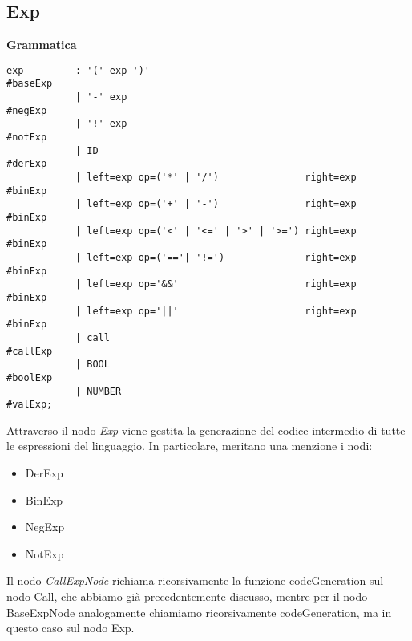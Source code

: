 \documentclass[12pt,twoside,openright,a4paper]{report}
\begin{document}
\subsection{Exp}
\textbf{Grammatica}
\begin{lstlisting}
exp	        : '(' exp ')'				                        #baseExp
            | '-' exp					                        #negExp
            | '!' exp                                           #notExp
            | ID						                        #derExp
            | left=exp op=('*' | '/')               right=exp   #binExp
            | left=exp op=('+' | '-')               right=exp   #binExp
            | left=exp op=('<' | '<=' | '>' | '>=') right=exp   #binExp
            | left=exp op=('=='| '!=')              right=exp   #binExp
            | left=exp op='&&'                      right=exp   #binExp
            | left=exp op='||'                      right=exp   #binExp
            | call                                              #callExp
            | BOOL                                              #boolExp
            | NUMBER					                        #valExp;

\end{lstlisting}

Attraverso il nodo \textit{Exp} viene gestita la generazione del codice intermedio di tutte le espressioni del linguaggio. In particolare, meritano una menzione i nodi: 
\begin{itemize}
    \item DerExp
    \item BinExp
    \item NegExp
    \item NotExp
\end{itemize}
Il nodo \textit{CallExpNode} richiama ricorsivamente la funzione codeGeneration sul nodo Call, che abbiamo già precedentemente discusso, mentre per il nodo BaseExpNode analogamente chiamiamo ricorsivamente codeGeneration, ma in questo caso sul nodo Exp.
\end{document}
